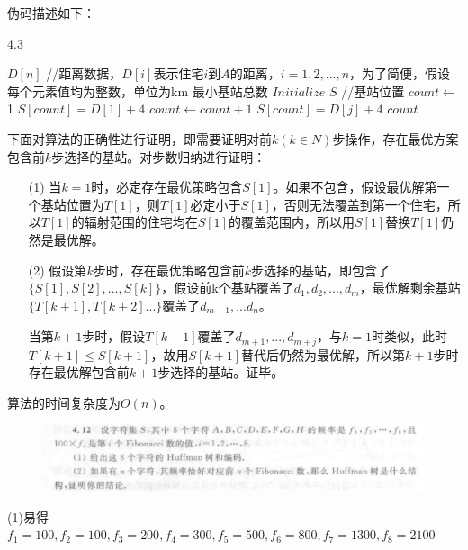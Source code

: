 伪码描述如下：
\begin{breakablealgorithm}
	\caption{4.3 } 
	\begin{algorithmic}[1]
		\REQUIRE $D[n]$ //距离数据，$D[i]$表示住宅$i$到$A$的距离，$i=1,2,...,n$，为了简便，假设每个元素值均为整数，单位为km
		\ENSURE 最小基站总数
		\STATE $Initialize$ $S$ //基站位置
		\STATE $count \gets$ 1
		\STATE $S[count]=D[1]+4$
					\STATE $count\gets count+1$
					\STATE $S[count]=D[j]+4$
				\ENDIF
		\ENDFOR
		\RETURN $count$
	\end{algorithmic}
\end{breakablealgorithm}
下面对算法的正确性进行证明，即需要证明对前$k(k\in N)$步操作，存在最优方案包含前$k$步选择的基站。对步数归纳进行证明：
\begin{enumerate}
	\item[(1)]
	当$k=1$时，必定存在最优策略包含$S[1]$。如果不包含，假设最优解第一个基站位置为$T[1]$，则$T[1]$必定小于$S[1]$，否则无法覆盖到第一个住宅，所以$T[1]$的辐射范围的住宅均在$S[1]$的覆盖范围内，所以用$S[1]$替换$T[1]$仍然是最优解。
	\item[(2)]
	假设第$k$步时，存在最优策略包含前$k$步选择的基站，即包含了$\{S[1],S[2],...,S[k]\}$，假设前k个基站覆盖了$d_1,d_2,...,d_m$，最优解剩余基站$\{T[k+1],T[k+2]...\}$覆盖了$d_{m+1},...d_n$。
	
	当第$k+1$步时，假设$T[k+1]$覆盖了$d_{m+1},...,d_{m+j}$，与$k=1$时类似，此时$T[k+1]\leq S[k+1]$，故用$S[k+1]$替代后仍然为最优解，所以第$k+1$步时存在最优解包含前$k+1$步选择的基站。证毕。
\end{enumerate}
算法的时间复杂度为$O(n)$。
\begin{tcolorbox}[colback=white!10!white,colframe=pink!100!black]
\begin{figure}[H]
	\centering
	\includegraphics[width=0.9\linewidth]{screenshot034}
	\label{fig:screenshot034}
\end{figure}
\end{tcolorbox}
\begin{solution}
\end{solution}
(1)易得$f_1=100,f_2=100,f_3=200,f_4=300,f_5=500,f_6=800,f_7=1300,f_8=2100$

